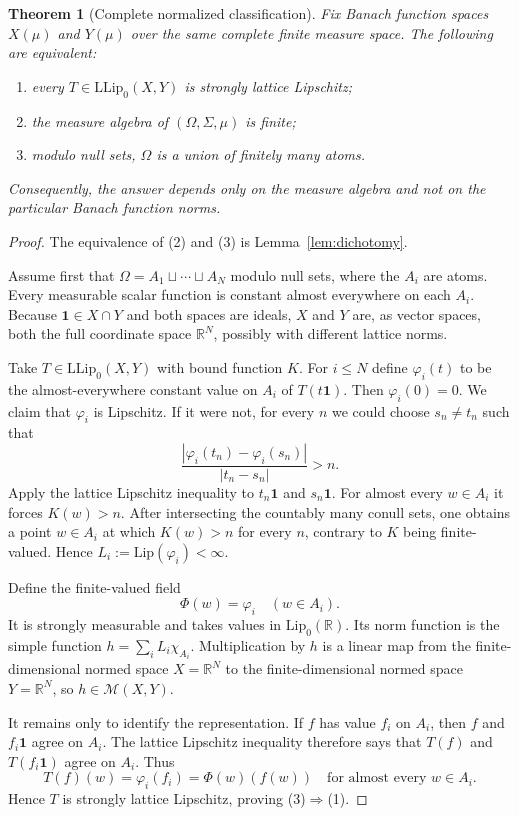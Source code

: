 \documentclass[11pt]{article}
\newtheorem{theorem}{Theorem}
\newcommand{\LL}{\mathrm{LLip}}
\newcommand{\Lip}{\mathrm{Lip}}
\newcommand{\M}{\mathcal M}
\newcommand{\1}{\mathbf 1}
\begin{document}
\begin{theorem}[Complete normalized classification]\label{thm:main}
Fix Banach function spaces $X(\mu)$ and $Y(\mu)$ over the same complete finite
measure space.  The following are equivalent:
\begin{enumerate}
\item every $T\in\LL_0(X,Y)$ is strongly lattice Lipschitz;
\item the measure algebra of $(\Omega,\Sigma,\mu)$ is finite;
\item modulo null sets, $\Omega$ is a union of finitely many atoms.
\end{enumerate}
Consequently, the answer depends only on the measure algebra and not on the
particular Banach function norms.
\end{theorem}

\begin{proof}
The equivalence of (2) and (3) is Lemma~\ref{lem:dichotomy}.

Assume first that $\Omega=A_1\sqcup\cdots\sqcup A_N$ modulo null sets, where
the $A_i$ are atoms.  Every measurable scalar function is constant almost
everywhere on each $A_i$.  Because $\1\in X\cap Y$ and both spaces are
ideals, $X$ and $Y$ are, as vector spaces, both the full coordinate space
$\mathbb R^N$, possibly with different lattice norms.

Take $T\in\LL_0(X,Y)$ with bound function $K$.  For $i\leq N$ define
$\varphi_i(t)$ to be the almost-everywhere constant value on $A_i$ of
$T(t\1)$.  Then $\varphi_i(0)=0$.  We claim that $\varphi_i$ is Lipschitz.
If it were not, for every $n$ we could choose $s_n\neq t_n$ such that
\[
 \frac{|\varphi_i(t_n)-\varphi_i(s_n)|}{|t_n-s_n|}>n.
\]
Apply the lattice Lipschitz inequality to $t_n\1$ and $s_n\1$.  For almost
every $w\in A_i$ it forces $K(w)>n$.  After intersecting the countably many
conull sets, one obtains a point $w\in A_i$ at which $K(w)>n$ for every $n$,
contrary to $K$ being finite-valued.  Hence
$L_i:=\Lip(\varphi_i)<\infty$.

Define the finite-valued field
\[
 \Phi(w)=\varphi_i\quad(w\in A_i).
\]
It is strongly measurable and takes values in $\Lip_0(\mathbb R)$.  Its norm
function is the simple function $h=\sum_i L_i\chi_{A_i}$.  Multiplication by
$h$ is a linear map from the finite-dimensional normed space $X=\mathbb R^N$
to the finite-dimensional normed space $Y=\mathbb R^N$, so
$h\in\M(X,Y)$.

It remains only to identify the representation.  If $f$ has value $f_i$ on
$A_i$, then $f$ and $f_i\1$ agree on $A_i$.  The lattice Lipschitz inequality
therefore says that $T(f)$ and $T(f_i\1)$ agree on $A_i$.  Thus
\[
 T(f)(w)=\varphi_i(f_i)=\Phi(w)(f(w))
 \quad\text{for almost every }w\in A_i.
\]
Hence $T$ is strongly lattice Lipschitz, proving (3)$\Rightarrow$(1).


\end{proof}
\end{document}
